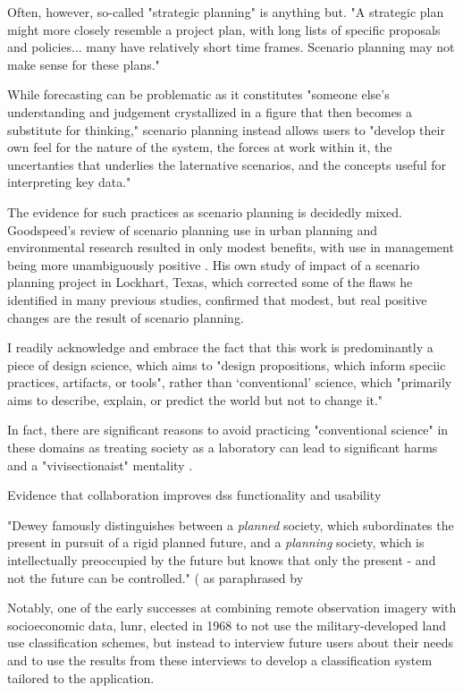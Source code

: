Often, however, so-called "strategic planning" is anything but. "A strategic plan might more closely resemble a project plan, with long lists of specific proposals and policies... many have relatively short time frames. Scenario planning may not make sense for these plans." \cite{goodspeedScenarioPlanningCities2020}



While forecasting can be problematic as it constitutes "someone else's understanding and judgement crystallized in a figure that then becomes a substitute for thinking," scenario planning instead allows users to "develop their own feel for the nature of the system, the forces at work within it, the uncertanties that underlies the laternative scenarios, and the concepts useful for interpreting key data." \cite{wackScenariosShootingRapids1985}

The evidence for such practices as scenario planning is decidedly mixed. Goodspeed's review of scenario planning use in urban planning and environmental research resulted in only modest benefits, with use in management being more unambiguously positive \cite{goodspeedScenarioPlanningCities2020}. His own study of impact of a scenario planning project in Lockhart, Texas, which corrected some of the flaws he identified in many previous studies, confirmed that modest, but real positive changes are the result of scenario planning.

I readily acknowledge and embrace the fact that this work is predominantly a piece of design science, which aims to "design propositions, which inform speciic practices, artifacts, or tools", rather than `conventional' science, which "primarily aims to describe, explain, or predict the world but not to change it." \cite{goodspeedScenarioPlanningCities2020}

In fact, there are significant reasons to avoid practicing "conventional science" in these domains as treating society as a laboratory can lead to significant harms and a "vivisectionaist" mentality \cite{banandynuriModernMedicineIts1990}.

Evidence that collaboration improves \ac{dss} functionality and usability \cite{goodspeedDeathLifeCollaborative2016, vonkSociotechnicalPSSDevelopment2010, brommelstroetPlanningSupportSystems2010, ulibarriCollaborativeModelDevelopment2018} 

"Dewey famously distinguishes between a \textit{planned} society, which subordinates the present in pursuit of a rigid planned future, and a \textit{planning} society, which is intellectually preoccupied by the future but knows that only the present - and not the future can be controlled." (\cite{deweyHumanNatureConduct2007} as paraphrased by \cite{goodspeedScenarioPlanningCities2020}

Notably, one of the early successes at combining remote observation imagery with socioeconomic data, \ac{lunr}, elected in 1968 to not use the military-developed land use classification schemes, but instead to interview future users about their needs and to use the results from these interviews to develop a classification system tailored to the application. 





